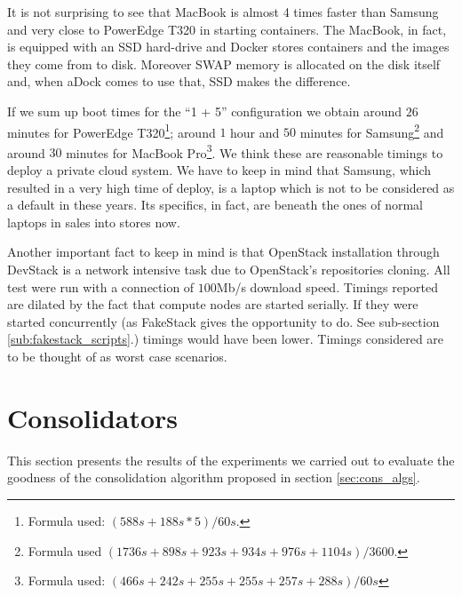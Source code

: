 It is not surprising to see that MacBook is almost 4 times faster than Samsung and very close to PowerEdge T320 in starting containers. The MacBook, in fact, is equipped with an SSD hard-drive and Docker stores containers and the images they come from to disk. Moreover SWAP memory is allocated on the disk itself and, when aDock comes to use that, SSD makes the difference.

If we sum up boot times for the ``1 + 5'' configuration we obtain around $26$ minutes for PowerEdge T320\footnote{Formula used: $(588s + 188s * 5) / 60s$.}; around $1$ hour and $50$ minutes for Samsung\footnote{Formula used $(1736s + 898s + 923s + 934s + 976s + 1104s) / 3600$.} and around $30$ minutes for MacBook Pro\footnote{Formula used: $(466s + 242s + 255s + 255s + 257s + 288s) / 60s$}. We think these are reasonable timings to deploy a private cloud system. We have to keep in mind that Samsung, which resulted in a very high time of deploy, is a laptop which is not to be considered as a default in these years. Its specifics, in fact, are beneath the ones of normal laptops in sales into stores now.

Another important fact to keep in mind is that OpenStack installation through DevStack is a network intensive task due to OpenStack's repositories cloning. All test were run with a connection of $100$Mb/s download speed.
Timings reported are dilated by the fact that compute nodes are started serially. If they were started concurrently (as FakeStack gives the opportunity to do. See sub-section \ref{sub:fakestack_scripts}.) timings would have been lower. Timings considered are to be thought of as worst case scenarios.

\section{Consolidators}
\label{sec:eval_cons}
\newcommand{\allownewline}[2][c]{\begin{tabular}[#1]{@{}c@{}}#2\end{tabular}}

This section presents the results of the experiments we carried out to evaluate the goodness of the consolidation algorithm proposed in section \ref{sec:cons_algs}.

